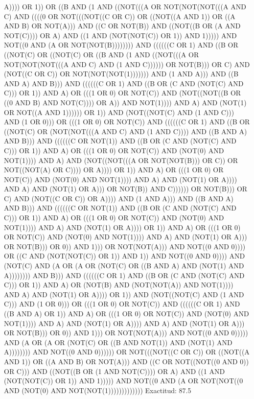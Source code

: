 A)))) OR 1)) OR ((B AND (1 AND ((NOT(((A OR NOT(NOT(NOT(((A AND C) AND ((((0 OR NOT(((NOT((C OR C)) OR ((NOT((A AND 1)) OR ((A AND B) OR NOT(A))) AND ((C OR NOT(B)) AND ((NOT((B OR (A AND NOT(C)))) OR A) AND ((1 AND (NOT(NOT(C)) OR 1)) AND 1))))) AND NOT((0 AND (A OR NOT(NOT(B)))))))) AND ((((((C OR 1) AND ((B OR ((NOT(C) OR ((NOT(C) OR ((B AND (1 AND ((NOT(((A OR NOT(NOT(NOT(((A AND C) AND (1 AND C)))))) OR NOT(B))) OR C) AND (NOT((C OR C)) OR NOT(NOT(NOT(1))))))) AND (1 AND A))) AND ((B AND A) AND B))) AND ((((((C OR 1) AND ((B OR (C AND (NOT(C) AND C))) OR 1)) AND A) OR (((1 OR 0) OR NOT(C)) AND (NOT((NOT((B OR ((0 AND B) AND NOT(C)))) OR A)) AND NOT(1)))) AND A) AND (NOT(1) OR NOT((A AND 1)))))) OR 1)) AND (NOT((NOT(C) AND (1 AND C))) AND (1 OR 0))) OR (((1 OR 0) OR NOT(C)) AND ((((((C OR 1) AND ((B OR ((NOT(C) OR (NOT(NOT(((A AND C) AND (1 AND C)))) AND ((B AND A) AND B))) AND ((((((C OR NOT(1)) AND ((B OR (C AND (NOT(C) AND C))) OR 1)) AND A) OR (((1 OR 0) OR NOT(C)) AND (NOT(0) AND NOT(1)))) AND A) AND (NOT((NOT(((A OR NOT(NOT(B))) OR C)) OR NOT((NOT(A) OR C)))) OR A)))) OR 1)) AND A) OR (((1 OR 0) OR NOT(C)) AND (NOT(0) AND NOT(1)))) AND A) AND (NOT(1) OR A)))) AND A) AND (NOT(1) OR A))) OR NOT(B)) AND C)))))) OR NOT(B))) OR C) AND (NOT((C OR C)) OR A)))) AND (1 AND A))) AND ((B AND A) AND B))) AND ((((((C OR NOT(1)) AND ((B OR (C AND (NOT(C) AND C))) OR 1)) AND A) OR (((1 OR 0) OR NOT(C)) AND (NOT(0) AND NOT(1)))) AND A) AND (NOT(1) OR A)))) OR 1)) AND A) OR (((1 OR 0) OR NOT(C)) AND (NOT(0) AND NOT(1)))) AND A) AND (NOT(1) OR A))) OR NOT(B))) OR 0)) AND 1))) OR NOT(NOT(A))) AND NOT((0 AND 0)))) OR ((C AND (NOT(NOT(C)) OR 1)) AND 1)) AND NOT((0 AND 0)))) AND (NOT(C) AND (A OR (A OR (NOT(C) OR ((B AND A) AND (NOT(1) AND A)))))))) AND B))) AND ((((((C OR 1) AND ((B OR (C AND (NOT(C) AND C))) OR 1)) AND A) OR (NOT(B) AND (NOT(NOT(A)) AND NOT(1)))) AND A) AND (NOT(1) OR A)))) OR 1)) AND (NOT((NOT(C) AND (1 AND C))) AND (1 OR 0))) OR (((1 OR 0) OR NOT(C)) AND ((((((C OR 1) AND ((B AND A) OR 1)) AND A) OR (((1 OR 0) OR NOT(C)) AND (NOT(0) AND NOT(1)))) AND A) AND (NOT(1) OR A)))) AND A) AND (NOT(1) OR A))) OR NOT(B))) OR 0)) AND 1))) OR NOT(NOT(A))) AND NOT((0 AND 0))))) AND (A OR (A OR (NOT(C) OR ((B AND NOT(1)) AND (NOT(1) AND A)))))))) AND NOT((0 AND 0)))))) OR NOT(((NOT((C OR C)) OR ((NOT((A AND 1)) OR ((A AND B) OR NOT(A))) AND ((C OR NOT((NOT((0 AND 0)) OR C))) AND ((NOT((B OR (1 AND NOT(C)))) OR A) AND ((1 AND (NOT(NOT(C)) OR 1)) AND 1))))) AND NOT((0 AND (A OR NOT(NOT((0 AND (NOT(0) AND NOT(NOT(1)))))))))))))
 Exactitud: 87.5%

